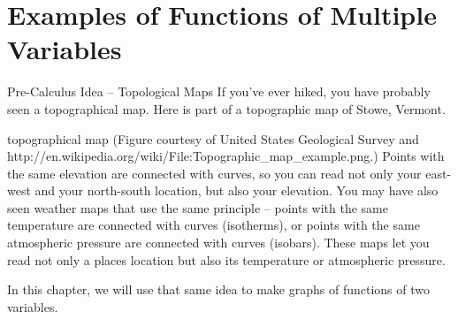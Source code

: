 \section{Examples of Functions of Multiple Variables}
\label{sec:examples}

Pre-Calculus Idea – Topological Maps
If you’ve ever hiked, you have probably seen a topographical map. Here is part of a topographic map of Stowe, Vermont.

topographical map
(Figure courtesy of United States Geological Survey and http://en.wikipedia.org/wiki/File:Topographic_map_example.png.)
Points with the same elevation are connected with curves, so you can read not only your east-west and your north-south location, but also your elevation. You may have also seen weather maps that use the same principle – points with the same temperature are connected with curves (isotherms), or points with the same atmospheric pressure are connected with curves (isobars). These maps let you read not only a places location but also its temperature or atmospheric pressure.

In this chapter, we will use that same idea to make graphs of functions of two variables.
